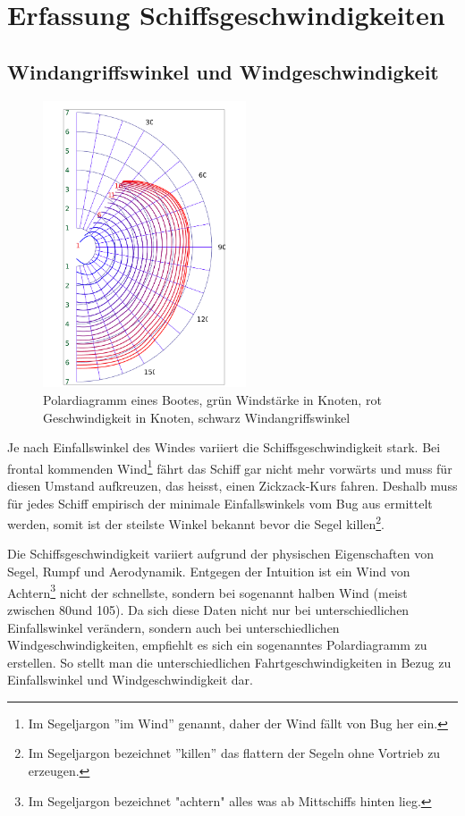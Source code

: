 
\section{Erfassung Schiffsgeschwindigkeiten}

\subsection{Windangriffswinkel und Windgeschwindigkeit}

\begin{figure} 
\centering
\includegraphics[width=6cm]{img/polardiagramm}
\caption{Polardiagramm eines Bootes, grün Windstärke in Knoten, rot
Geschwindigkeit in Knoten, schwarz Windangriffswinkel}
\label{polardiagram}
\end{figure}

Je nach Einfallswinkel des Windes variiert die Schiffsgeschwindigkeit stark.
Bei frontal kommenden Wind\footnote{Im Segeljargon ''im Wind'' genannt, daher
der Wind fällt von Bug her ein.} fährt das Schiff gar nicht mehr vorwärts und
muss für diesen Umstand aufkreuzen, das heisst, einen Zickzack-Kurs fahren.
Deshalb muss für jedes Schiff empirisch der minimale Einfallswinkels vom Bug
aus ermittelt werden, somit ist der steilste Winkel bekannt bevor die Segel
killen\footnote{Im Segeljargon bezeichnet ''killen'' das flattern der Segeln
ohne Vortrieb zu erzeugen.}.

Die Schiffsgeschwindigkeit variiert aufgrund der physischen Eigenschaften von
Segel, Rumpf und Aerodynamik. Entgegen der Intuition ist ein Wind von
Achtern\footnote{Im Segeljargon bezeichnet "achtern" alles was ab Mittschiffs
hinten lieg.} nicht der schnellste, sondern bei sogenannt halben Wind (meist
zwischen 80\degree und 105\degree). Da sich diese Daten nicht nur bei
unterschiedlichen Einfallswinkel verändern, sondern auch bei unterschiedlichen
Windgeschwindigkeiten, empfiehlt es sich ein sogenanntes Polardiagramm zu
erstellen. So stellt man die unterschiedlichen Fahrtgeschwindigkeiten in Bezug
zu Einfallswinkel und Windgeschwindigkeit dar.

